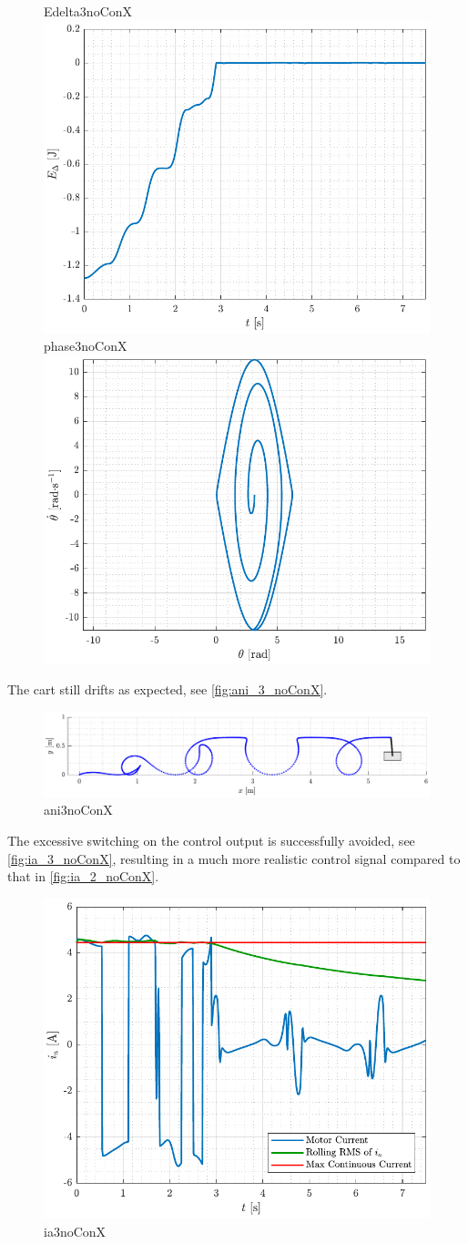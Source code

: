 \begin{figure}[H]
  \hspace{-10pt}
  \captionbox
  {
    Edelta3noConX
    \label{fig:Edelta_3_noConX}
  }
  {
    \hspace{-1cm}
    \includegraphics[width=.46\textwidth]{figures/Edelta_3_noConX}
  }
  \hspace{20pt}
  \captionbox 
  {
    phase3noConX
    \label{fig:phase_3_noConX}
  }
  {
    \hspace{-1cm}
    \includegraphics[width=.46\textwidth]{figures/phase_3_noConX}
  }  
\end{figure}
%
The cart still drifts as expected, see \autoref{fig:ani_3_noConX}.
%
\begin{figure}[H]
  \includegraphics[width=.7\textwidth]{figures/ani_3_noConX}
  \caption{ani3noConX}
  \label{fig:ani_3_noConX}
\end{figure}
%
The excessive switching on the control output is successfully avoided, see \autoref{fig:ia_3_noConX}, resulting in a much more realistic control signal compared to that in \autoref{fig:ia_2_noConX}.
%
\begin{figure}[H]
  \includegraphics[width=.52\textwidth]{figures/ia_3_noConX}
  \caption{ia3noConX}
  \label{fig:ia_3_noConX}
\end{figure}
